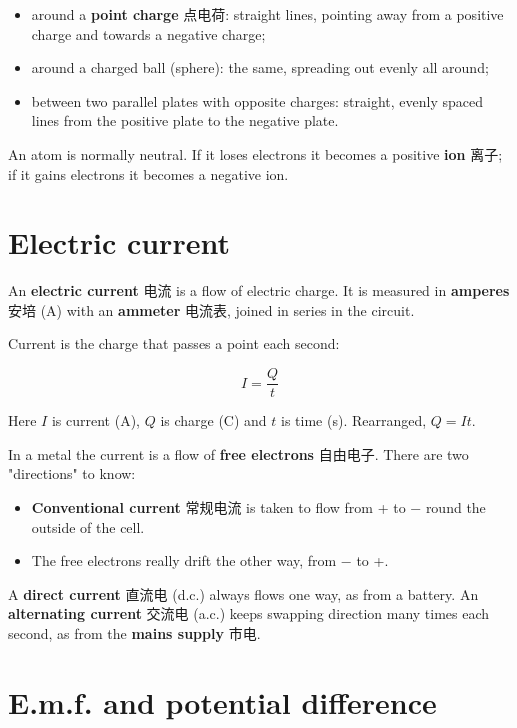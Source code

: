 \documentclass[11pt]{article}
\begin{document}
\begin{itemize}
\item around a \textbf{point charge} 点电荷: straight lines, pointing away from a positive charge and towards a negative charge;

\item around a charged ball (sphere): the same, spreading out evenly all around;

\item between two parallel plates with opposite charges: straight, evenly spaced lines from the positive plate to the negative plate.

\end{itemize}

An atom is normally neutral. If it loses electrons it becomes a positive \textbf{ion} 离子; if it gains electrons it becomes a negative ion.

\section*{Electric current}

An \textbf{electric current} 电流 is a flow of electric charge. It is measured in \textbf{amperes} 安培 (A) with an \textbf{ammeter} 电流表, joined in series in the circuit.

Current is the charge that passes a point each second:

\[
I = \frac{Q}{t}
\]

Here $I$ is current (A), $Q$ is charge (C) and $t$ is time (s). Rearranged, $Q = It$.

In a metal the current is a flow of \textbf{free electrons} 自由电子. There are two "directions" to know:

\begin{itemize}
\item \textbf{Conventional current} 常规电流 is taken to flow from + to − round the outside of the cell.

\item The free electrons really drift the other way, from − to +.

\end{itemize}

A \textbf{direct current} 直流电 (d.c.) always flows one way, as from a battery. An \textbf{alternating current} 交流电 (a.c.) keeps swapping direction many times each second, as from the \textbf{mains supply} 市电.

\section*{E.m.f. and potential difference}
\end{document}

